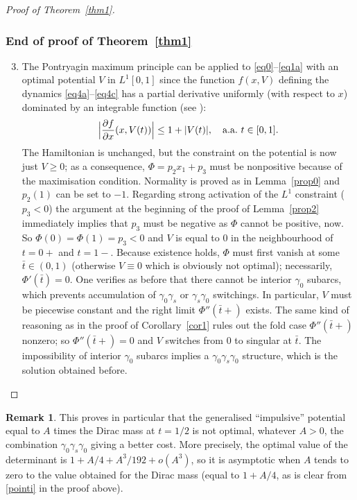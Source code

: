 \documentclass[11pt]{article}
\newcommand{\Subsubsection}{\subsubsection}
\theoremstyle{plain}
\theoremstyle{definition}
\newtheorem{remark}[theorem]{Remark}
\renewcommand{\dot}[1]{#1'}
\renewcommand{\ddot}[1]{#1''}
\newcommand{\frp}[2]{\frac{\partial #1}{\partial #2}}
\begin{document}
\begin{proof}[Proof of Theorem~\ref{thm1}]
\Subsubsection*{End of proof of Theorem~\ref{thm1}}
\begin{enumerate}\setcounter{enumi}{2}
\item\label{pointiii}
The Pontryagin maximum principle can be applied to \eqref{eq0}--\eqref{eq1a}
with an optimal potential $V$ in $L^1[0,1]$ since the function $f(x,V)$
defining the dynamics
\eqref{eq4a}--\eqref{eq4c} has a partial derivative uniformly (with respect to $x$) dominated by
an integrable function (see \cite[\S 4.2.C, Rem.\,5]{cesari-1983a}):
\[
\Bigl|\frp{f}{x}(x,V(t))\Bigr| \leq 1+|V(t)|,\quad \text{a.a.\ }t \in [0,1].
\]
The Hamiltonian is unchanged, but the constraint on the potential is now just $V \geq 0$;
as a consequence, $\Phi=p_2x_1+p_3$ must be nonpositive because of the maximisation
condition. Normality is proved as in Lemma~\ref{prop0} and $p_2(1)$ can be set to $-1$.
Regarding strong activation of the $L^1$ constraint ($p_3<0$) the argument at the
beginning of the proof of Lemma~\ref{prop2} immediately implies that $p_3$ must be
negative as $\Phi$ cannot be positive, now. So $\Phi(0)=\Phi(1)=p_3<0$ and $V$ is
equal to $0$ in the neighbourhood of $t=0+$ and $t=1-$. Because existence holds,
$\Phi$ must first vanish at some $\bar{t} \in (0,1)$ (otherwise $V \equiv 0$ which is
obviously not optimal); necessarily, $\dot{\Phi}(\bar{t})=0$. One verifies as before
that there cannot be interior $\gamma_0$ subarcs, which prevents accumulation of
$\gamma_0\gamma_s$ or $\gamma_s\gamma_0$ switchings. In particular, $V$ must be piecewise
constant and the right limit $\ddot{\Phi}(\bar{t}+)$ exists. The same kind of reasoning
as in the proof of Corollary~\ref{cor1} rules out the fold case $\ddot{\Phi}(\bar{t}+)$
nonzero; so $\ddot{\Phi}(\bar{t}+)=0$ and $V$ switches from $0$ to singular at
$\bar{t}$. The impossibility of interior $\gamma_0$ subarcs implies a
$\gamma_0\gamma_s\gamma_0$ structure, which is the solution obtained before.\qedhere
\end{enumerate}
\end{proof}

\begin{remark}
This proves in particular that the generalised
``impulsive'' potential equal to $A$ times the
Dirac mass at $t=1/2$ is not optimal, whatever $A>0$,
the combination $\gamma_0\gamma_s\gamma_0$ giving a better cost.
More precisely, the optimal value of the determinant is $1+A/4+A^3/192+o(A^3)$,
so it is asymptotic when $A$ tends to zero to the value obtained for the Dirac mass
(equal to $1+A/4$, as is clear from \eqref{pointi} in the proof above).
\end{remark}
\end{document}
